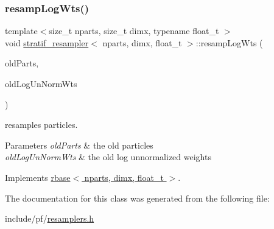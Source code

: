\subsubsection{\texorpdfstring{resamp\+Log\+Wts()}{resampLogWts()}}
{\footnotesize\ttfamily template$<$size\+\_\+t nparts, size\+\_\+t dimx, typename float\+\_\+t $>$ \\
void \hyperlink{classstratif__resampler}{stratif\+\_\+resampler}$<$ nparts, dimx, float\+\_\+t $>$\+::resamp\+Log\+Wts (\begin{DoxyParamCaption}\item[{\hyperlink{classrbase_aa12fc826befa6ba0647b5f59ebc396ee}{array\+Vec} \&}]{old\+Parts,  }\item[{\hyperlink{classrbase_a6f76bef853e508cb5b6f546d231b06f5}{array\+Float} \&}]{old\+Log\+Un\+Norm\+Wts }\end{DoxyParamCaption})\hspace{0.3cm}{\ttfamily [virtual]}}



resamples particles. 


\begin{DoxyParams}{Parameters}
{\em old\+Parts} & the old particles \\
\hline
{\em old\+Log\+Un\+Norm\+Wts} & the old log unnormalized weights \\
\hline
\end{DoxyParams}


Implements \hyperlink{classrbase_aff0f6f88fd4656e67f5ebc870f10dd44}{rbase$<$ nparts, dimx, float\+\_\+t $>$}.



The documentation for this class was generated from the following file\+:\begin{DoxyCompactItemize}
\item 
include/pf/\hyperlink{resamplers_8h}{resamplers.\+h}\end{DoxyCompactItemize}
